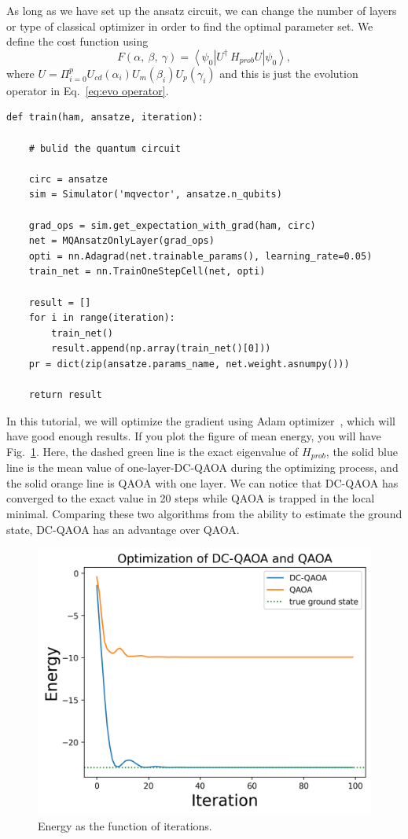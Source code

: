 As long as we have set up the ansatz circuit, we can change the number of layers or type of classical optimizer in order to find the optimal parameter set. We define the cost function using
\begin{equation}
    F(\alpha,~\beta,~\gamma) = \left<\psi_0\right|U^{\dagger}\ H_{prob} U\left|\psi_0\right>,
\end{equation}
where $U = \Pi_{i=0}^p U_{cd}(\alpha_i)U_m(\beta_i)U_p(\gamma_i)$ and this is just the evolution operator in Eq.~\ref{eq:evo operator}.
\begin{lstlisting}
def train(ham, ansatze, iteration):

    # bulid the quantum circuit

    circ = ansatze
    sim = Simulator('mqvector', ansatze.n_qubits)

    grad_ops = sim.get_expectation_with_grad(ham, circ)
    net = MQAnsatzOnlyLayer(grad_ops)
    opti = nn.Adagrad(net.trainable_params(), learning_rate=0.05)
    train_net = nn.TrainOneStepCell(net, opti)

    result = []
    for i in range(iteration):
        train_net()
        result.append(np.array(train_net()[0]))
    pr = dict(zip(ansatze.params_name, net.weight.asnumpy()))

    return result
\end{lstlisting}

In this tutorial, we will optimize the gradient using Adam optimizer~\cite{PhysRevResearch.6.013147}, which will have good enough results. If you plot the figure of mean energy, you will have Fig.~\ref{fig:dc}. Here, the dashed green line is the exact eigenvalue of $H_{prob}$, the solid blue line is the mean value of one-layer-DC-QAOA during the optimizing process, and the solid orange line is QAOA with one layer. We can notice that DC-QAOA has converged to the exact value in 20 steps while QAOA is trapped in the local minimal. Comparing these two algorithms from the ability to estimate the ground state, DC-QAOA has an advantage over QAOA.
\begin{figure}
    \centering
    \includegraphics[width = 1 \linewidth]{5.4.1_figure/DC-QAOA.png}
    \caption{Energy as the function of iterations.}
    \label{fig:dc}
\end{figure}